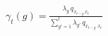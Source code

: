 \documentclass[12pt,border=8pt]{standalone}
\begin{document}
\Large
\begin{math}\displaystyle
\gamma_t(g) = \frac{\lambda_g \, q_{x_{t-g}\, x_t}}{\sum_{g'=1}^{l} \lambda_{g'} \, q_{x_{t-g'}\, x_t}}
\end{math}
\end{document}
